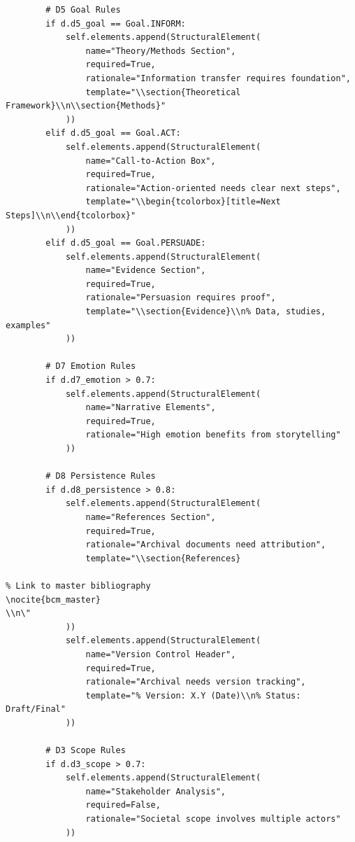 \begin{verbatim}
        # D5 Goal Rules
        if d.d5_goal == Goal.INFORM:
            self.elements.append(StructuralElement(
                name="Theory/Methods Section",
                required=True,
                rationale="Information transfer requires foundation",
                template="\\section{Theoretical Framework}\\n\\section{Methods}"
            ))
        elif d.d5_goal == Goal.ACT:
            self.elements.append(StructuralElement(
                name="Call-to-Action Box",
                required=True,
                rationale="Action-oriented needs clear next steps",
                template="\\begin{tcolorbox}[title=Next Steps]\\n\\end{tcolorbox}"
            ))
        elif d.d5_goal == Goal.PERSUADE:
            self.elements.append(StructuralElement(
                name="Evidence Section",
                required=True,
                rationale="Persuasion requires proof",
                template="\\section{Evidence}\\n% Data, studies, examples"
            ))

        # D7 Emotion Rules
        if d.d7_emotion > 0.7:
            self.elements.append(StructuralElement(
                name="Narrative Elements",
                required=True,
                rationale="High emotion benefits from storytelling"
            ))

        # D8 Persistence Rules
        if d.d8_persistence > 0.8:
            self.elements.append(StructuralElement(
                name="References Section",
                required=True,
                rationale="Archival documents need attribution",
                template="\\section{References}

% Link to master bibliography
\nocite{bcm_master}
\\n\"
            ))
            self.elements.append(StructuralElement(
                name="Version Control Header",
                required=True,
                rationale="Archival needs version tracking",
                template="% Version: X.Y (Date)\\n% Status: Draft/Final"
            ))

        # D3 Scope Rules
        if d.d3_scope > 0.7:
            self.elements.append(StructuralElement(
                name="Stakeholder Analysis",
                required=False,
                rationale="Societal scope involves multiple actors"
            ))


\end{verbatim}
